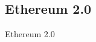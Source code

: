 \subsection{Ethereum 2.0\label{ethereum2.0}}
\begin{otherlanguage}{english}

Ethereum 2.0

\end{otherlanguage}